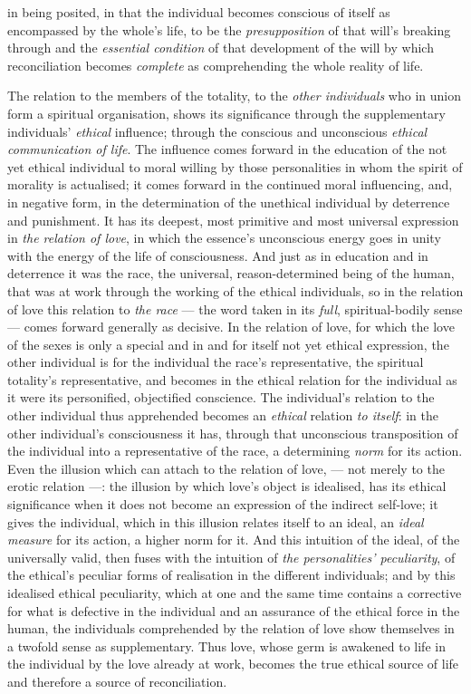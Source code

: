 \documentclass[12pt,a4paper]{book}
\begin{document}
in being posited, in that the individual becomes conscious of itself as
encompassed by the whole's life, to be the \emph{presupposition} of that will's
breaking through and the \emph{essential condition} of that development of the
will by which reconciliation becomes \emph{complete} as comprehending the whole
reality of life.

The relation to the members of the totality, to the \emph{other individuals}
who in union form a spiritual organisation, shows its significance through the
supplementary individuals' \emph{ethical} influence; through the conscious and
unconscious \emph{ethical communication of life}. The influence comes forward
in the education of the not yet ethical individual to moral willing by those
personalities in whom the spirit of morality is actualised; it comes forward in
the continued moral influencing, and, in negative form, in the determination of
the unethical individual by deterrence and punishment. It has its deepest, most
primitive and most universal expression in \emph{the relation of love}, in which
the essence's unconscious energy goes in unity with the energy of the life of
consciousness. And just as in education and in deterrence it was the race, the
universal, reason-determined being of the human, that was at work through the
working of the ethical individuals, so in the relation of love this relation to
\emph{the race} --- the word taken in its \emph{full}, spiritual-bodily sense
--- comes forward generally as decisive. In the relation of love, for which the
love of the sexes is only a special and in and for itself not yet ethical
expression, the other individual is for the individual the race's
representative, the spiritual totality's representative, and becomes in the
ethical relation for the individual as it were its personified, objectified
conscience. The individual's relation to the other individual thus apprehended
becomes an \emph{ethical} relation \emph{to itself}: in the other individual's
consciousness it has, through that unconscious transposition of the individual
into a representative of the race, a determining \emph{norm} for its action.
Even the illusion which can attach to the relation of love, --- not merely to
the erotic relation ---: the illusion by which love's object is idealised, has
its ethical significance when it does not become an expression of the indirect
self-love; it gives the individual, which in this illusion relates itself to an
ideal, an \emph{ideal measure} for its action, a higher norm for it. And this
intuition of the ideal, of the universally valid, then fuses with the intuition
of \emph{the personalities' peculiarity}, of the ethical's peculiar forms of
realisation in the different individuals; and by this idealised ethical
peculiarity, which at one and the same time contains a corrective for what is
defective in the individual and an assurance of the ethical force in the human,
the individuals comprehended by the relation of love show themselves in a
twofold sense as supplementary. Thus love, whose germ is awakened to life in
the individual by the love already at work, becomes the true ethical source of
life and therefore a source of reconciliation.
\end{document}
